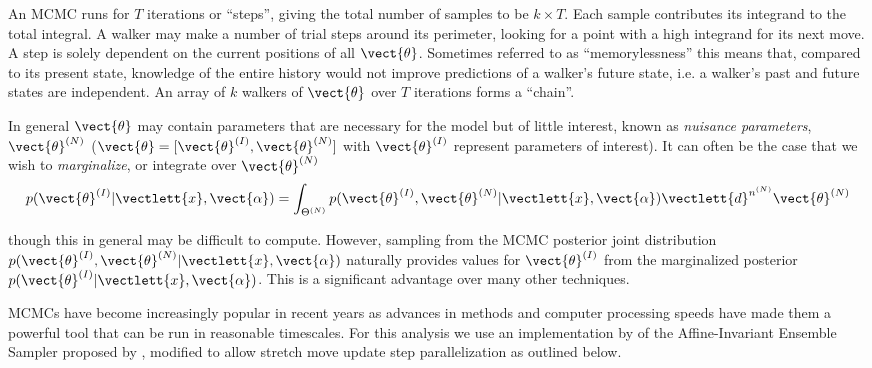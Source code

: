 An MCMC runs for $T$ iterations or ``steps'', giving the total number of samples to be $k \times T$.  Each sample contributes its
integrand to the total integral.  A walker may make a number of trial steps around its perimeter, looking for a point with a high
integrand for its next move.  A step is solely dependent on the current positions of all $\vect{\theta}$.  Sometimes referred to as
``memorylessness'' this means that, compared to its present state, knowledge of the entire history would not improve predictions of a
walker's future state, i.e. a walker's past and future states are independent.  An array of $k$ walkers of $\vect{\theta}$ over $T$
iterations forms a ``chain''.

In general $\vect{\theta}$ may contain parameters that are necessary for the model but of little interest,
known as \textit{nuisance parameters}, $\vect{\theta}^{(N)}$ ($\vect{\theta} = [\vect{\theta}^{(I)}, \vect{\theta}^{(N)}]$ with
$\vect{\theta}^{(I)}$ represent parameters of interest).  It can often be the case that we wish to \textit{marginalize}, or integrate
over $\vect{\theta}^{(N)}$
\begin{equation}
p(\vect{\theta}^{(I)}|\vectlett{x}, \vect{\alpha}) = \int_{\Theta^{(N)}}
p(\vect{\theta}^{(I)}, \vect{\theta}^{(N)}|\vectlett{x}, \vect{\alpha}) \vectlett{d}^{n^{(N)}}\vect{\theta}^{(N)}
\end{equation}

\noindent though this in general may be difficult to compute.  However, sampling from the MCMC posterior joint distribution
$p(\vect{\theta}^{(I)}, \vect{\theta}^{(N)}|\vectlett{x}, \vect{\alpha})$ naturally provides values for $\vect{\theta}^{(I)}$ from the
marginalized posterior $p(\vect{\theta}^{(I)}|\vectlett{x}, \vect{\alpha})$.  This is a significant advantage over many other techniques.

MCMCs have become increasingly popular in recent years as advances in methods and computer processing speeds have made them
a powerful tool that can be run in reasonable timescales.  For this analysis we use an implementation by  of
the Affine-Invariant Ensemble Sampler proposed by , modified to allow stretch move update step parallelization as
outlined below.

